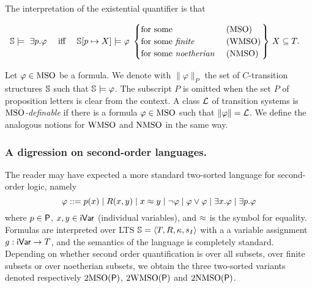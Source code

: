 The interpretation of the existential quantifier is that

\begin{align*}
\model \models\ \exists p. \varphi  & \quad\text{ iff }\quad  \model[p \mapsto X] \models \phi \,
\left.\begin{cases}
 \text{for some }   & {\bf (\mso)} \\
  \text{for some \emph{finite} }   & {\bf (\wmso)} \\
    \text{for some \emph{noetherian} }   & {\bf (\nmso)} 
 \end{cases}\right\}\,
 X \subseteq T.
\end{align*}

Let $\varphi\in \mathrm{MSO}$ be a formula. We denote with $\|\varphi \|_P$ the set
of $C$-transition structures $\mathbb{S}$ such that $\mathbb{S}\models \varphi$.
The subscript $P$ is omitted when the set $P$ of proposition letters is clear
from the context.
A class $\mathcal{L}$ of transition systems is $\mathrm{MSO}$\emph{-definable} if there
is a formula $\varphi \in \mathrm{MSO}$ such that $\| \varphi \| = \mathcal{L}$.
We define the analogous notions for $\mathrm{WMSO}$ and $\mathrm{NMSO}$ in the same way.



\subsubsection*{A digression on second-order languages.}
The reader may have expected a more standard two-sorted language for second-order logic, namely
%
$$
\varphi ::= p(x)
\mid R(x,y)
\mid x \approx y
\mid \neg \varphi
\mid \varphi \lor \varphi
\mid \exists x.\varphi
\mid \exists p.\varphi
$$%
where $p \in \mathsf{P}$, $x,y \in \mathsf{iVar}$ (individual variables), %
and $\approx$ is the symbol for equality.   Formulas  are interpreted over LTS $\mathbb{S} = \langle{T,R,\kappa, s_I}\rangle$ with a a variable assignment $g: \mathsf{iVar} \to T$, and the semantics of the language is completely standard. Depending on whether second order quantification is over all subsets, over finite subsets or over noetherian subsets, we obtain the three two-sorted variants  denoted respectively $2\mathrm{MSO}(\mathsf{P})$, $2\mathrm{WMSO}(\mathsf{P})$ and $2\mathrm{NMSO}(\mathsf{P})$.

